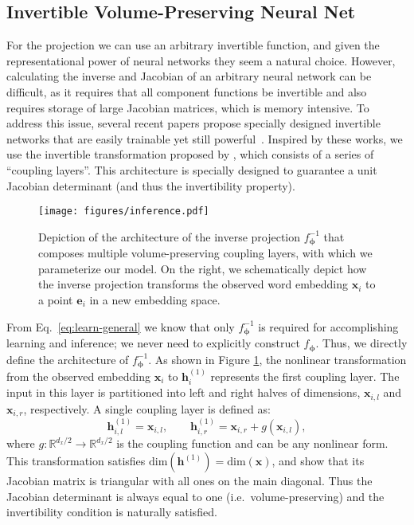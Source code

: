 \documentclass[11pt,a4paper]{article}
\begin{document}
\subsection{Invertible Volume-Preserving Neural Net}
For the projection we can use an arbitrary invertible function, and given the representational power of neural networks they seem a natural choice. However, calculating the inverse and Jacobian of an arbitrary neural network can be difficult, as it requires that all component functions be invertible and also requires storage of large Jacobian matrices, which is memory intensive.
To address this issue, several recent papers propose specially designed invertible networks that are easily trainable yet still powerful~\citep{dinh2014nice, dinh2016density, jacobsen2018revnet}. Inspired by these works, we use the invertible transformation proposed by \citet{dinh2014nice}, which consists of a series of ``coupling layers''.  This architecture is specially designed to guarantee a unit Jacobian determinant (and thus the invertibility property).

\begin{figure}[!t]
\centering
    \texttt{[image: figures/inference.pdf]}
    \caption{Depiction of the architecture of the inverse projection $f_{\bm{\phi}}^{-1}$ that composes multiple volume-preserving coupling layers, with which we parameterize our model. On the right, we schematically depict how the inverse projection transforms the observed word embedding $\bm{x}_i$ to a point $\bm{e}_i$ in a new embedding space.}
    \label{fig:opt}
\vspace{-5mm}
\end{figure}

From Eq.~\eqref{eq:learn-general} we know that only $f_{\bm{\phi}}^{-1}$ is required for accomplishing learning and inference; we never need to explicitly construct $f_{\bm{\phi}}$. Thus, we directly define the architecture of $f_{\bm{\phi}}^{-1}$. As shown in Figure \ref{fig:opt}, the nonlinear transformation from the observed embedding $\bm{x}_i$ to $\bm{h}_i^{(1)}$ represents the first coupling layer. The input in this layer is partitioned into left and right halves of dimensions, $\bm{x}_{i, l}$ and $\bm{x}_{i, r}$,  respectively. A single coupling layer is defined as:
\begin{equation}
\bm{h}_{i, l}^{(1)} = \bm{x}_{i, l}, \qquad
\bm{h}_{i, r}^{(1)} = \bm{x}_{i, r} + g(\bm{x}_{i, l}),
\end{equation}
where $g: \mathbb{R}^{d_x/2} \rightarrow \mathbb{R}^{d_x/2}$ is the coupling function and can be any nonlinear form. This transformation satisfies $\text{dim}(\bm{h}^{(1)}) = \text{dim}(\bm{x})$, and \citet{dinh2014nice} show that its Jacobian matrix is triangular with all ones on the main diagonal. Thus the Jacobian determinant is always equal to one (i.e.~volume-preserving) and the invertibility condition is naturally satisfied. 
\end{document}
